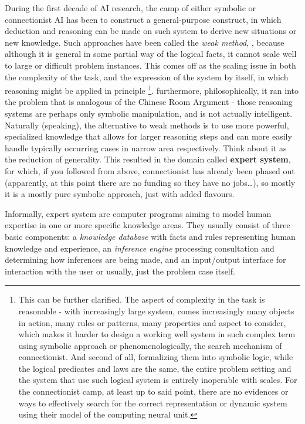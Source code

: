 During the first decade of AI research, the camp of either symbolic or connectionist AI has been to construct a general-purpose construct, in which deduction and reasoning can be made on such system to derive new situations or new knowledge. Such approaches have been called the \textit{weak method}, \cite{10.5555/1671238}, because although it is general in some partial way of the logical facts, it cannot scale well to large or difficult problem instances. This comes off as the scaling issue in both the complexity of the task, and the expression of the system by itself, in which reasoning might be applied in principle \footnote{This can be further clarified. The aspect of complexity in the task is reasonable - with increasingly large system, comes increasingly many objects in action, many rules or patterns, many properties and aspect to consider, which makes it harder to design a working well system in such complex term using symbolic approach or phenomenologically, the search mechanism of connectionist. And second of all, formalizing them into symbolic logic, while the logical predicates and laws are the same, the entire problem setting and the system that use such logical system is entirely inoperable with scales. For the connectionist camp, at least up to said point, there are no evidences or ways to effectively search for the correct representation or dynamic system using their model of the computing neural unit.}. furthermore, philosophically, it ran into the problem that is analogous of the Chinese Room Argument - those reasoning systems are perhaps only symbolic manipulation, and is not actually intelligent. Naturally (speaking), the alternative to weak methods is to use more powerful, specialized knowledge that allows for larger reasoning steps and can more easily handle typically occurring cases in narrow area respectively. Think about it as the reduction of generality. This resulted in the domain called \textbf{expert system}, for which, if you followed from above, connectionist has already been phased out (apparently, at this point there are no funding so they have no jobs\dots), so mostly it is a mostly pure symbolic approach, just with added flavours. 

Informally, expert system are computer programs aiming to model human expertise in one or more specific knowledge areas. They usually consist of three basic components: a \textit{knowledge database}  with facts and rules representing human knowledge and experience, an \textit{inference engine} processing consultation and determining how inferences are being made, and an input/output interface for interaction with the user or usually, just the problem case itself. 

